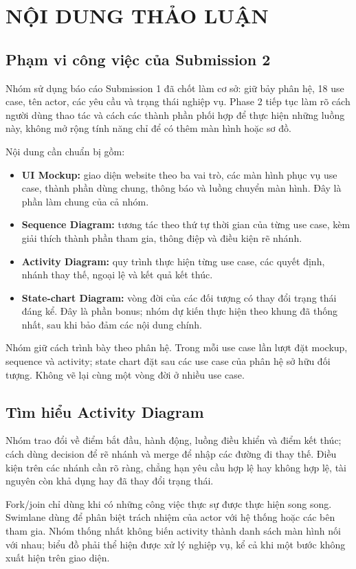 \documentclass[10pt,a4paper]{article}
\begin{document}
\section{NỘI DUNG THẢO LUẬN}

\subsection{Phạm vi công việc của Submission 2}
Nhóm sử dụng báo cáo Submission 1 đã chốt làm cơ sở: giữ bảy phân hệ, 18 use case, tên actor, các yêu cầu và trạng thái nghiệp vụ. Phase 2 tiếp tục làm rõ cách người dùng thao tác và cách các thành phần phối hợp để thực hiện những luồng này, không mở rộng tính năng chỉ để có thêm màn hình hoặc sơ đồ.

Nội dung cần chuẩn bị gồm:
\begin{itemize}
  \item \textbf{UI Mockup:} giao diện website theo ba vai trò, các màn hình phục vụ use case, thành phần dùng chung, thông báo và luồng chuyển màn hình. Đây là phần làm chung của cả nhóm.
  \item \textbf{Sequence Diagram:} tương tác theo thứ tự thời gian của từng use case, kèm giải thích thành phần tham gia, thông điệp và điều kiện rẽ nhánh.
  \item \textbf{Activity Diagram:} quy trình thực hiện từng use case, các quyết định, nhánh thay thế, ngoại lệ và kết quả kết thúc.
  \item \textbf{State-chart Diagram:} vòng đời của các đối tượng có thay đổi trạng thái đáng kể. Đây là phần bonus; nhóm dự kiến thực hiện theo khung đã thống nhất, sau khi bảo đảm các nội dung chính.
\end{itemize}

Nhóm giữ cách trình bày theo phân hệ. Trong mỗi use case lần lượt đặt mockup, sequence và activity; state chart đặt sau các use case của phân hệ sở hữu đối tượng. Không vẽ lại cùng một vòng đời ở nhiều use case.

\subsection{Tìm hiểu Activity Diagram}
Nhóm trao đổi về điểm bắt đầu, hành động, luồng điều khiển và điểm kết thúc; cách dùng decision để rẽ nhánh và merge để nhập các đường đi thay thế. Điều kiện trên các nhánh cần rõ ràng, chẳng hạn yêu cầu hợp lệ hay không hợp lệ, tài nguyên còn khả dụng hay đã thay đổi trạng thái.

Fork/join chỉ dùng khi có những công việc thực sự được thực hiện song song. Swimlane dùng để phân biệt trách nhiệm của actor với hệ thống hoặc các bên tham gia. Nhóm thống nhất không biến activity thành danh sách màn hình nối với nhau; biểu đồ phải thể hiện được xử lý nghiệp vụ, kể cả khi một bước không xuất hiện trên giao diện.
\end{document}
